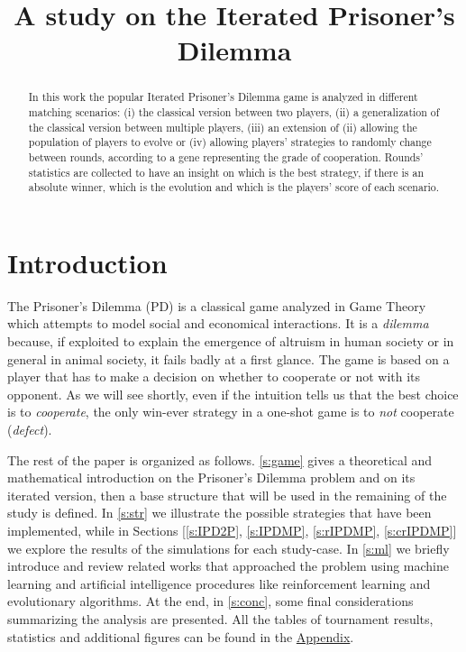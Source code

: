 \documentclass[journal,a4paper,10pt,twoside]{IEEEtran} %
\begin{document}
\title{A study on the Iterated Prisoner's Dilemma}

\author{%

}

\maketitle

\begin{abstract}
In this work the popular Iterated Prisoner's Dilemma game is analyzed in different matching scenarios: (i) the classical version between two players, (ii) a generalization of the classical version between multiple players, (iii) an extension of (ii) allowing the population of players to evolve or (iv) allowing players' strategies to randomly change between rounds, according to a gene representing the grade of cooperation. %
Rounds' statistics are collected to have an insight on which is the best strategy, if there is an absolute winner, which is the evolution and which is the players' score of each scenario.
\end{abstract}

\section{Introduction} \label{s:intro}
The Prisoner's Dilemma (PD) is a classical game analyzed in Game Theory which attempts to model social and economical interactions. It is a \textit{dilemma} because, if exploited to explain the emergence of altruism in human society or in general in animal society, it fails badly at a first glance. The game is based on a player that has to make a decision on whether to cooperate or not with its opponent. As we will see shortly, even if the intuition tells us that the best choice is to \textit{cooperate}, the only win-ever strategy in a one-shot game is to \textit{not} cooperate (\textit{defect}).

The rest of the paper is organized as follows.
\autoref{s:game} gives a theoretical and mathematical introduction on the Prisoner's Dilemma problem and on its iterated version, then a base structure that will be used in the remaining of the study is defined.
In \autoref{s:str} we illustrate the possible strategies that have been implemented, while in Sections [\ref{s:IPD2P}, \ref{s:IPDMP}, \ref{s:rIPDMP}, \ref{s:crIPDMP}] we explore the results of the simulations for each study-case.
In \autoref{s:ml} we briefly introduce and review related works that approached the problem using machine learning and artificial intelligence procedures like reinforcement learning and evolutionary algorithms.
At the end, in \autoref{s:conc}, some final considerations summarizing the analysis are presented.
All the tables of tournament results, statistics and additional figures can be found in the \hyperref[s:appendix]{Appendix}. 
\end{document}
